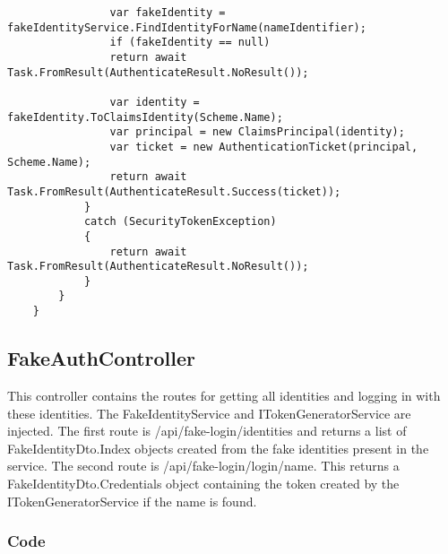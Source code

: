 \begin{verbatim}
                var fakeIdentity = fakeIdentityService.FindIdentityForName(nameIdentifier);
                if (fakeIdentity == null)
                return await Task.FromResult(AuthenticateResult.NoResult());
                
                var identity = fakeIdentity.ToClaimsIdentity(Scheme.Name);
                var principal = new ClaimsPrincipal(identity);
                var ticket = new AuthenticationTicket(principal, Scheme.Name);
                return await Task.FromResult(AuthenticateResult.Success(ticket));
            }
            catch (SecurityTokenException)
            {
                return await Task.FromResult(AuthenticateResult.NoResult());
            }
        }
    }
\end{verbatim}

\subsection{FakeAuthController}

This controller contains the routes for getting all identities and logging in with these identities. The FakeIdentityService and ITokenGeneratorService are injected. The first route is /api/fake-login/identities and returns a list of FakeIdentityDto.Index objects created from the fake identities present in the service. The second route is /api/fake-login/login/{name}. This returns a FakeIdentityDto.Credentials object containing the token created by the ITokenGeneratorService if the name is found.

\subsubsection{Code}

